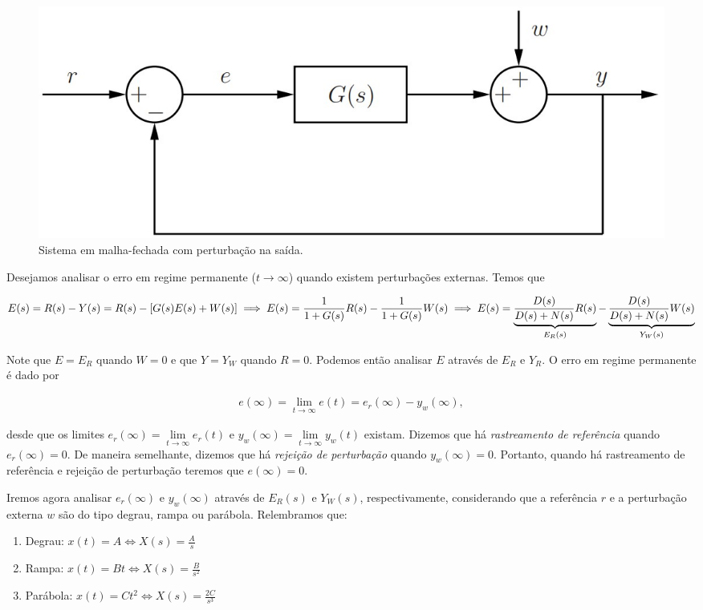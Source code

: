 \documentclass[
]{book}
\providecommand{\tightlist}{%
  \setlength{\itemsep}{0pt}\setlength{\parskip}{0pt}}
\theoremstyle{definition}
\theoremstyle{definition}
\theoremstyle{definition}
\theoremstyle{remark}
\begin{document}
\begin{figure}
\includegraphics[width=0.8\linewidth]{Imagens/Lab4/Apresentação/fig1} \caption{Sistema em malha-fechada com perturbação na saída.}\label{fig:fig41}
\end{figure}

Desejamos analisar o erro em regime permanente (\(t \to \infty\)) quando existem perturbações externas. Temos que

\[
E(s) = R(s) - Y(s) = R(s) - [G(s)E(s) + W(s)]\\
\implies E(s) = \frac {1}{1 + G(s)}R(s) - \frac {1}{1+G(s)}W(s) \\
\implies E(s) = \underbrace{\frac {D(s)}{D(s) + N(s)}R(s)}_{E_R(s)} - \underbrace{\frac {D(s)}{D(s) + N(s)}W(s)}_{Y_W(s)}
\]

Note que \(E = E_R\) quando \(W= 0\) e que \(Y = Y_W\) quando \(R=0\). Podemos então analisar \(E\) através de \(E_R\) e \(Y_R\). O erro em regime permanente é dado por

\begin{align}
e(\infty) = \lim\limits_{t \to \infty}{e(t)} = e_r(\infty) - y_w(\infty), \label{eq:eq41}
\end{align}

desde que os limites \(e_r(\infty) = \lim\limits_{t\to \infty}{e_r(t)}\) e \(y_w(\infty) = \lim\limits_{t \to \infty}{y_w(t)}\) existam. Dizemos que há \emph{rastreamento de referência} quando \(e_r(\infty) = 0\). De maneira semelhante, dizemos que há \emph{rejeição de perturbação} quando \(y_w(\infty) = 0\). Portanto, quando há rastreamento de referência e rejeição de perturbação teremos que \(e(\infty) = 0\).

Iremos agora analisar \(e_r(\infty)\) e \(y_w(\infty)\) através de \(E_R(s)\) e \(Y_W(s)\), respectivamente, considerando que a referência \(r\) e a perturbação externa \(w\) são do tipo degrau, rampa ou parábola. Relembramos que:

\begin{enumerate}
\def\labelenumi{\arabic{enumi}.}
\tightlist
\item
  Degrau: \(x(t) = A \iff X(s) = \frac {A}{s}\)
\item
  Rampa: \(x(t) = Bt \iff X(s) = \frac {B}{s^2}\)
\item
  Parábola: \(x(t) = Ct^2 \iff X(s) = \frac {2C}{s^3}\)
\end{enumerate}
\end{document}
